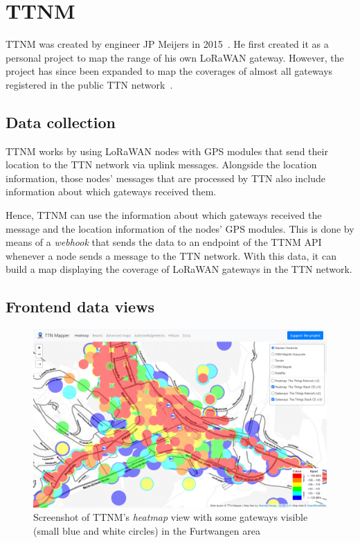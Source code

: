 
\section{\acf{TTNM}}

\acf{TTNM} was created by engineer JP Meijers in 2015~\cite{linkedin_23_nodate}.
He first created it as a personal project to map the range of his own \ac{LoRaWAN} gateway.
However, the project has since been expanded to map the coverages of almost all gateways registered in the public \ac{TTN} network~\cite{the_things_network_jp_2018}.

\subsection{Data collection}

\acl{TTNM} works by using \ac{LoRaWAN} nodes with \ac{GPS} modules that send their location to the \ac{TTN} network via uplink messages.
Alongside the location information, those nodes' messages that are processed by \ac{TTN} also include information about which gateways received them.

Hence, \acl{TTNM} can use the information about which gateways received the message and the location information of the nodes' \ac{GPS} modules.
This is done by means of a \emph{webhook} that sends the data to an endpoint of the \acl{TTNM} \ac{API} whenever a node sends a message to the \ac{TTN} network.
With this data, it can build a map displaying the coverage of \ac{LoRaWAN} gateways in the \ac{TTN} network.

\subsection{Frontend data views}

\begin{figure}[h]
    \centering
    \includegraphics[width=1\textwidth]{pictures/ttn-mapper/heatmap_with_gateways.png}
    \caption{Screenshot of \ac{TTNM}'s \emph{heatmap} view with some gateways visible (small blue and white circles) in the Furtwangen area~\protect\cite{ttn_mapper_ttn_2023}}\label{pic:ttn-mapper-heatmap-with-gateways}
\end{figure}

